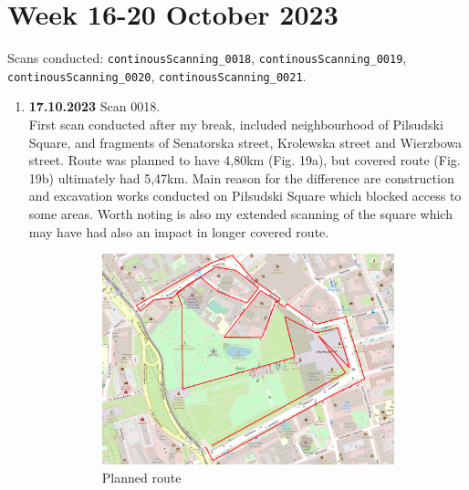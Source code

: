 \documentclass[a4paper,12pt]{article}
\begin{document}
\section{Week 16-20 October 2023}
Scans conducted: \verb|continousScanning_0018|, \verb|continousScanning_0019|, \verb|continousScanning_0020|, \verb|continousScanning_0021|.\\
\begin{enumerate}
	\item \textbf{17.10.2023} Scan 0018. \\
	First scan conducted after my break, included neighbourhood of Pilsudski Square, and fragments of Senatorska street, Krolewska street and Wierzbowa street. Route was planned to have 4,80km (Fig. 19a), but covered route (Fig. 19b) ultimately had 5,47km. Main reason for the difference are construction and excavation works conducted on Piłsudski Square which blocked access to some areas. Worth noting is also my extended scanning of the square which may have had also an impact in longer covered route.
	\begin{figure}[H]
		\centering
		\begin{subfigure}{.95\textwidth}
			\centering
			\includegraphics[width=1\linewidth]{route_p18}
			\caption{Planned route}
			\label{fig:a18}
		\end{subfigure}%
		\linebreak
		\begin{subfigure}{.95\textwidth}
			\centering

\end{subfigure}
\end{figure}
\end{enumerate}
\end{document}
